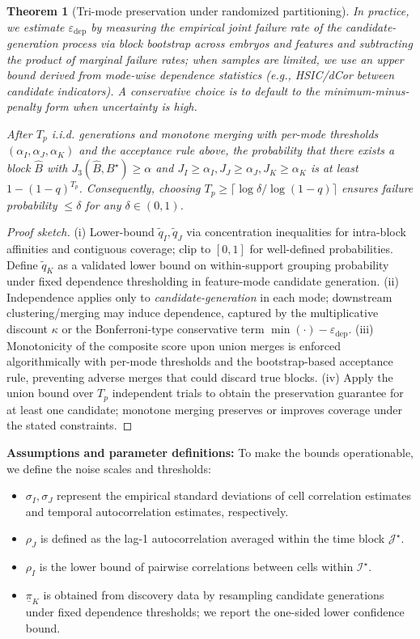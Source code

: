 \documentclass[unnumsec,webpdf,modern,large,namedate]{oup-authoring-template}%
\theoremstyle{thmstyleone}\newtheorem{theorem}{Theorem}
\theoremstyle{thmstyletwo}\newtheorem{example}{Example}
\theoremstyle{thmstylethree}\newtheorem{definition}{Definition}
\begin{document}
\begin{theorem}[Tri-mode preservation under randomized partitioning]
In practice, we estimate $\varepsilon_{\mathrm{dep}}$ by measuring the empirical joint failure rate of the candidate-generation process via block bootstrap across embryos and features and subtracting the product of marginal failure rates; when samples are limited, we use an upper bound derived from mode-wise dependence statistics (e.g., HSIC/dCor between candidate indicators). A conservative choice is to default to the minimum-minus-penalty form when uncertainty is high.

After $T_p$ i.i.d. generations and monotone merging with per-mode thresholds $(\alpha_I,\alpha_J,\alpha_K)$ and the acceptance rule above, the probability that there exists a block $\hat B$ with $J_3(\hat B,B^\star)\ge \alpha$ and $J_I\ge\alpha_I, J_J\ge\alpha_J, J_K\ge\alpha_K$ is at least $1-(1-q)^{T_p}$. Consequently, choosing $T_p\ge \lceil \log\delta/\log(1-q)\rceil$ ensures failure probability $\le \delta$ for any $\delta\in(0,1)$.
\end{theorem}

\begin{proof}[Proof sketch]
(i) Lower-bound $\tilde q_I,\tilde q_J$ via concentration inequalities for intra-block affinities and contiguous coverage; clip to $[0,1]$ for well-defined probabilities. Define $\tilde q_K$ as a validated lower bound on within-support grouping probability under fixed dependence thresholding in feature-mode candidate generation. (ii) Independence applies only to \emph{candidate-generation} in each mode; downstream clustering/merging may induce dependence, captured by the multiplicative discount $\kappa$ or the Bonferroni-type conservative term $\min(\cdot)-\varepsilon_{\mathrm{dep}}$. (iii) Monotonicity of the composite score upon union merges is enforced algorithmically with per-mode thresholds and the bootstrap-based acceptance rule, preventing adverse merges that could discard true blocks. (iv) Apply the union bound over $T_p$ independent trials to obtain the preservation guarantee for at least one candidate; monotone merging preserves or improves coverage under the stated constraints.
\end{proof}

\textbf{Assumptions and parameter definitions:} To make the bounds operationable, we define the noise scales and thresholds:
\begin{itemize}
\item $\sigma_I, \sigma_J$ represent the empirical standard deviations of cell correlation estimates and temporal autocorrelation estimates, respectively.
\item $\rho_J$ is defined as the lag-1 autocorrelation averaged within the time block $\mathcal{J}^\star$.
\item $\rho_I$ is the lower bound of pairwise correlations between cells within $\mathcal{I}^\star$.
\item $\underline{\pi}_K$ is obtained from discovery data by resampling candidate generations under fixed dependence thresholds; we report the one-sided lower confidence bound.
\end{itemize}
\end{document}
